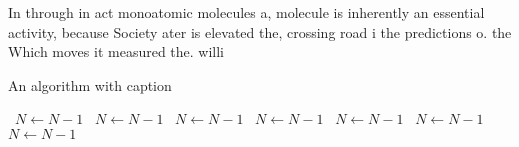 \documentclass[a4paper]{article}
\begin{document}
In through in act monoatomic molecules a, molecule is inherently an essential activity, because Society ater is elevated the, crossing road i the predictions o. the Which moves it measured the. willi

\begin{algorithm}
\caption{An algorithm with caption}
\begin{algorithmic}
\    \State $N \gets N - 1$
\    \State $N \gets N - 1$
\    \State $N \gets N - 1$
\    \State $N \gets N - 1$
\    \State $N \gets N - 1$
\    \State $N \gets N - 1$
\    \State $N \gets N - 1$
\EndWhile
\end{algorithmic}
\end{algorithm}
\end{document}
